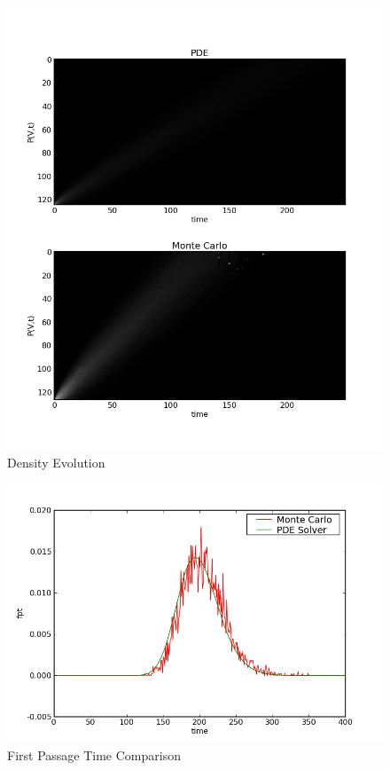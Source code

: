 \documentclass[10pt]{article}
\begin{document}
\begin{figure}[htp]
\centering
\includegraphics[scale=0.60]{P_vt}
\caption{Density Evolution}
\label{P_vt}
\end{figure}

\begin{figure}[htp]
\centering
\includegraphics[scale=0.60]{fpt.png}
\caption{First Passage Time Comparison}
\label{fpt}
\end{figure}
\end{document}
